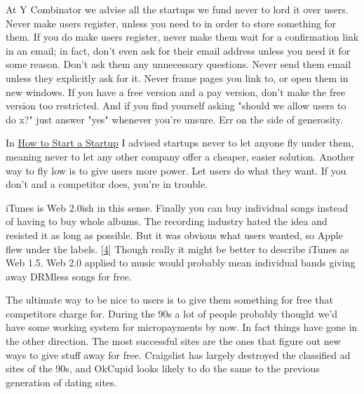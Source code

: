 At Y Combinator we advise all the
                    startups we fund never to lord it over users. Never make
                    users register, unless you need to in order to store
                    something for them. If you do make users register, never
                    make them wait for a confirmation link in an email; in fact,
                    don't even ask for their email address unless you need it
                    for some reason. Don't ask them any unnecessary questions.
                    Never send them email unless they explicitly ask for it.
                    Never frame pages you link to, or open them in new windows.
                    If you have a free version and a pay version, don't make the
                    free version too restricted. And if you find yourself asking
                    "should we allow users to do x?" just answer "yes" whenever
                    you're unsure. Err on the side of generosity.

In
                    \href{http://www.paulgraham.com/start.html}{How to Start a Startup} I advised
                    startups never to let anyone fly under them, meaning never
                    to let any other company offer a cheaper, easier solution.
                    Another way to fly low is to give users more power. Let
                    users do what they want. If you don't and a competitor does,
                    you're in trouble.

iTunes is Web 2.0ish in this
                    sense. Finally you can buy individual songs instead of
                    having to buy whole albums. The recording industry hated the
                    idea and resisted it as long as possible. But it was obvious
                    what users wanted, so Apple flew under the labels.
                    [\href{\#f4n}{4}]
                    Though really it might be better to describe iTunes as Web
                    1.5. Web 2.0 applied to music would probably mean individual
                    bands giving away DRMless songs for free.

The
                    ultimate way to be nice to users is to give them something
                    for free that competitors charge for. During the 90s a lot
                    of people probably thought we'd have some working system for
                    micropayments by now. In fact things have gone in the other
                    direction. The most successful sites are the ones that
                    figure out new ways to give stuff away for free. Craigslist
                    has largely destroyed the classified ad sites of the 90s,
                    and OkCupid looks likely to do the same to the previous
                    generation of dating sites.

